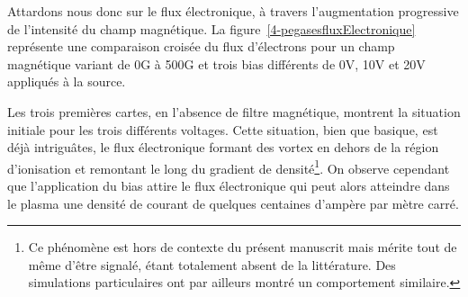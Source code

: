 \begin{refsection}
Attardons nous donc sur le flux électronique, à travers l'augmentation
progressive de l'intensité du champ magnétique. La
figure~\ref{4-pegasesfluxElectronique} représente une comparaison croisée du
flux d'électrons pour un champ magnétique variant de 0G à 500G et trois bias
différents de 0V, 10V et 20V appliqués à la source. 

Les trois premières cartes, en l'absence de filtre magnétique, montrent la
situation initiale pour les trois différents voltages. Cette situation, bien que
basique, est déjà intriguâtes, le flux électronique formant des
vortex en dehors de la région d'ionisation et remontant le long du
gradient de densité\footnote{Ce phénomène est hors de contexte du présent
manuscrit mais mérite tout de même d'être signalé, étant totalement absent de
la littérature.
Des simulations particulaires ont par ailleurs montré un comportement
similaire.}. On observe cependant que l'application du bias attire le flux
électronique qui peut alors atteindre dans le plasma une densité de courant de
quelques centaines d'ampère par mètre carré.


\end{refsection}
